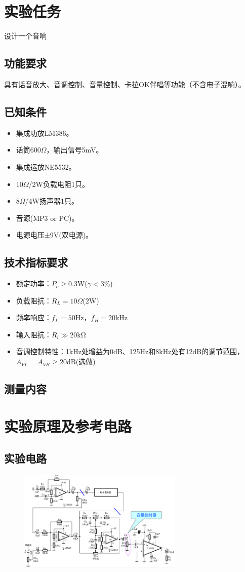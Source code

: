 \documentclass[a4paper,11pt,UTF8]{article}
\numberwithin{equation}{subsection}
\begin{document}
\section{实验任务}
设计一个音响
\subsection{功能要求}
具有话音放大、音调控制、音量控制、卡拉OK伴唱等功能（不含电子混响）。
\subsection{已知条件}
\begin{itemize}
	\setlength{\itemsep}{0pt}
	\item 集成功放LM386。
	\item 话筒600$\Omega$，输出信号5mV。
	\item 集成运放NE5532。
	\item 10$\Omega$/2W负载电阻1只。
	\item 8$\Omega$/4W扬声器1只。
	\item 音源(MP3 or PC)。
	\item 电源电压±9V(双电源)。	
\end{itemize}
\subsection{技术指标要求}
\begin{itemize}
	\setlength{\itemsep}{0pt}	
	\item 额定功率：$P_o\geq0.3$W($\gamma< 3\%$)
	\item 负载阻抗：$R_L=10\Omega$(2W)
	\item 频率响应：$f_L=50$Hz，$f_H=20$kHz
	\item 输入阻抗：$R_i\gg20\mathrm{k\Omega}$
	\item 音调控制特性：1kHz处增益为0dB、125Hz和8kHz处有12dB的调节范围，$A_{VL}=A_{VH}≥20$dB(选做)
	
\end{itemize}
\subsection{测量内容}
\section{实验原理及参考电路}
\subsection{实验电路}
\begin{figure}[H]
	\centering
	\includegraphics[width=0.7\textwidth]{1}
\end{figure}
\end{document}
